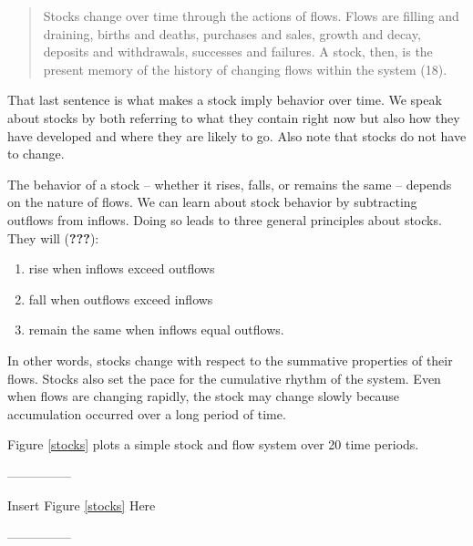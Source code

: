\documentclass[english,,man]{apa6}
\providecommand{\tightlist}{%
  \setlength{\itemsep}{0pt}\setlength{\parskip}{0pt}}
\theoremstyle{definition}
\theoremstyle{definition}
\theoremstyle{definition}
\theoremstyle{remark}
\begin{document}
\begin{quote}
Stocks change over time through the actions of flows. Flows are filling
and draining, births and deaths, purchases and sales, growth and decay,
deposits and withdrawals, successes and failures. A stock, then, is the
present memory of the history of changing flows within the system (18).
\end{quote}

\noindent That last sentence is what makes a stock imply behavior over
time. We speak about stocks by both referring to what they contain right
now but also how they have developed and where they are likely to go.
Also note that stocks do not have to change.

The behavior of a stock -- whether it rises, falls, or remains the same
-- depends on the nature of flows. We can learn about stock behavior by
subtracting outflows from inflows. Doing so leads to three general
principles about stocks. They will ({\textbf{???}}):

\begin{enumerate}
\def\labelenumi{\arabic{enumi}.}
\tightlist
\item
  rise when inflows exceed outflows
\item
  fall when outflows exceed inflows
\item
  remain the same when inflows equal outflows.
\end{enumerate}

\noindent In other words, stocks change with respect to the summative
properties of their flows. Stocks also set the pace for the cumulative
rhythm of the system. Even when flows are changing rapidly, the stock
may change slowly because accumulation occurred over a long period of
time.

Figure \ref{stocks} plots a simple stock and flow system over 20 time
periods.

\begin{center}

---------------

Insert Figure \ref{stocks} Here

---------------

\end{center}
\end{document}
